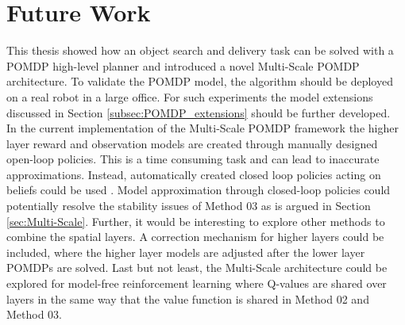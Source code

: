 \section{Future Work}
This thesis showed how an object search and delivery task can be solved with a POMDP high-level planner and introduced a novel Multi-Scale POMDP architecture. To validate the POMDP model, the algorithm should be deployed on a real robot in a large office. For such experiments the model extensions discussed in Section \ref{subsec:POMDP_extensions} should be further developed.\\

In the current implementation of the Multi-Scale POMDP framework the higher layer reward and observation models are created through manually designed open-loop policies. This is a time consuming task and can lead to inaccurate approximations. Instead, automatically created closed loop policies acting on beliefs could be used \cite{7140035}. Model approximation through closed-loop policies could potentially resolve the stability issues of Method 03 as is argued in Section \ref{sec:Multi-Scale}. Further, it would be interesting to explore other methods to combine the spatial layers. A correction mechanism for higher layers could be included, where the higher layer models are adjusted after the lower layer POMDPs are solved. Last but not least, the Multi-Scale architecture could be explored for model-free reinforcement learning where Q-values are shared over layers in the same way that the value function is shared in Method 02 and Method 03. 
 
